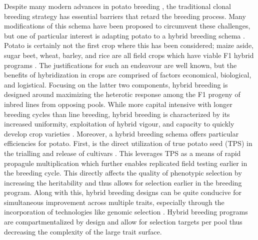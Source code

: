 \documentclass[
]{article}
\begin{document}
Despite many modern advances in potato breeding \autocite{Bethke2019},
the traditional clonal breeding strategy has essential barriers that
retard the breeding process. Many modifications of this schema have been
proposed to circumvent these challenges, but one of particular interest
is adapting potato to a hybrid breeding schema
\autocite{Lindhout2011,Jansky2018,Bradshaw2022}. Potato is certainly not
the first crop where this has been considered; maize aside, sugar beet,
wheat, barley, and rice are all field crops which have viable F1 hybrid
programs \autocite{Crow1998}. The justifications for such an endeavour
are well known, but the benefits of hybridization in crops are comprised
of factors economical, biological, and logistical. Focusing on the
latter two components, hybrid breeding is designed around maximizing the
heterotic response among the F1 progeny of inbred lines from opposing
pools. While more capital intensive with longer breeding cycles than
line breeding, hybrid breeding is characterized by its increased
uniformity, exploitation of hybrid vigour, and capacity to quickly
develop crop varieties \autocite{Cowling2020,Labroo2021}. Moreover, a
hybrid breeding schema offers particular efficiencies for potato. First,
is the direct utilization of true potato seed (TPS) in the trialling and
release of cultivars \autocite{Almekinders1996,Stockem2021}. This
leverages TPS as a means of rapid propagule multiplication which further
enables replicated field testing earlier in the breeding cycle. This
directly affects the quality of phenotypic selection by increasing the
heritability and thus allows for selection earlier in the breeding
program. Along with this, hybrid breeding designs can be quite conducive
for simultaneous improvement across multiple traits, especially through
the incorporation of technologies like genomic selection
\autocite{Zhao2015,Peixoto2024}. Hybrid breeding programs are
compartmentalized by design and allow for selection targets per pool
thus decreasing the complexity of the large trait surface.
\end{document}
